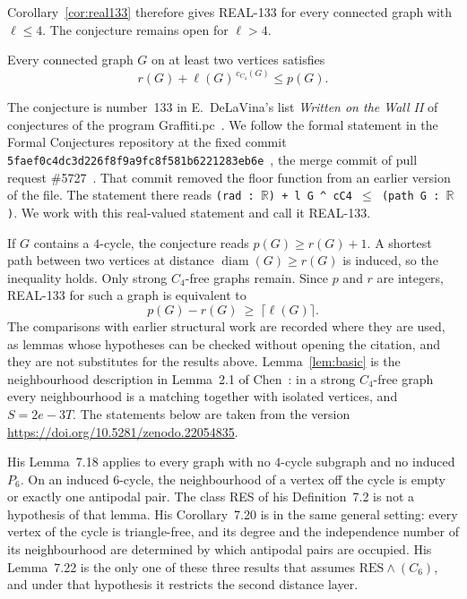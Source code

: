 \documentclass[ASNA]{USG}
\theoremstyle{WBstyletwo}
\numberwithin{equation}{section}
\newcommand{\lr}{\ell}
\newcommand{\pp}{p}
\begin{document}
Corollary~\ref{cor:real133} therefore gives REAL-133 for every connected graph with $\lr\le 4$. The conjecture remains open for $\lr>4$.


\begin{conjecture}\label{conj:133}
Every connected graph $G$ on at least two vertices satisfies
\[
r(G)+\lr(G)^{\,c_{C_4}(G)}\le \pp(G).
\]
\end{conjecture}

The conjecture is number~133 in E.~DeLaVina's list \emph{Written on the Wall II} of conjectures of the program Graffiti.pc~\cite{wowii}. We follow the formal statement in the Formal Conjectures repository at the fixed commit \nolinkurl{5faef0c4dc3d226f8f9a9fc8f581b6221283eb6e}~\cite{fc133}, the merge commit of pull request \#5727~\cite{fcpr}. That commit removed the floor function from an earlier version of the file. The statement there reads \texttt{(rad : $\mathbb{R}$) + l G \^{} cC4 $\le$ (path G : $\mathbb{R}$)}. We work with this real-valued statement and call it REAL-133.

If $G$ contains a $4$-cycle, the conjecture reads $\pp(G)\ge r(G)+1$. A shortest path between two vertices at distance $\operatorname{diam}(G)\ge r(G)$ is induced, so the inequality holds. Only strong $C_4$-free graphs remain. Since $\pp$ and $r$ are integers, REAL-133 for such a graph is equivalent to
\begin{equation}\label{eq:target}
\pp(G)-r(G)\ \ge\ \lceil \lr(G)\rceil .
\end{equation}
The comparisons with earlier structural work are recorded where they are used, as lemmas whose hypotheses can be checked without opening the citation, and they are not substitutes for the results above. Lemma~\ref{lem:basic} is the neighbourhood description in Lemma~2.1 of Chen~\cite{chen}: in a strong $C_4$-free graph every neighbourhood is a matching together with isolated vertices, and $S=2e-3T$. The statements below are taken from the version \url{https://doi.org/10.5281/zenodo.22054835}.

His Lemma~7.18 applies to every graph with no $4$-cycle subgraph and no induced $P_6$. On an induced $6$-cycle, the neighbourhood of a vertex off the cycle is empty or exactly one antipodal pair. The class RES of his Definition~7.2 is not a hypothesis of that lemma. His Corollary~7.20 is in the same general setting: every vertex of the cycle is triangle-free, and its degree and the independence number of its neighbourhood are determined by which antipodal pairs are occupied. His Lemma~7.22 is the only one of these three results that assumes $\mathrm{RES}\wedge(C_6)$, and under that hypothesis it restricts the second distance layer.
\end{document}
